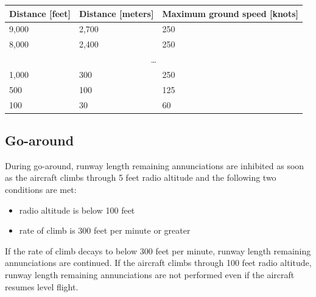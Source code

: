 \documentclass[a4paper,12pt]{article}
\begin{document}
\begin{center}
\begin{tabular}[c]{|l|l|l|}
\hline

\rowcolor{tablehdrcolor}

\textbf{Distance [feet]} & \textbf{Distance [meters]} &
\textbf{Maximum ground speed [knots]} \\

\hline

9,000 & 2,700 & 250 \\

\hline

8,000 & 2,400 & 250 \\

\hline

\multicolumn{3}{|c|}{\ldots} \\

\hline

1,000 & 300 & 250 \\

\hline

500 & 100 & 125 \\

\hline

100 & 30 & 60 \\

\hline

\end{tabular}
\end{center}

\subsection{Go-around}
\label{subsec:GoAround}

During go-around, runway length remaining annunciations are inhibited as
soon as the aircraft climbs through 5 feet radio altitude and the
following two conditions are met:

\begin{itemize}

\item radio altitude is below 100 feet

\item rate of climb is 300 feet per minute or greater

\end{itemize}

\noindent If the rate of climb decays to below 300 feet per minute,
runway length remaining annunciations are continued. If the aircraft
climbs through 100 feet radio altitude, runway length remaining
annunciations are not performed even if the aircraft resumes level
flight.
\end{document}
